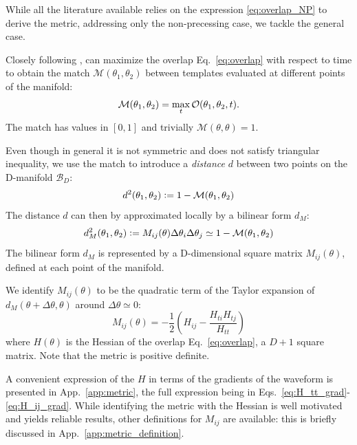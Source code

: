 \documentclass[twocolumn,showpacs,preprintnumbers,nofootinbib,prd,
superscriptaddress,10pt]{revtex4-2}
\begin{document}
While all the literature available \cite{owen_metric, Messenger:2008ta, Prix:2007ks, Brown:2012qf, Roy:2017oul, Coogan:2022qxs, Hanna:2022zpk} relies on the expression \eqref{eq:overlap_NP} to derive the metric, addressing only the non-precessing case, we tackle the general case.

Closely following \cite{owen_metric}, can maximize the overlap Eq.~\eqref{eq:overlap} with respect to time to obtain the match $\mathcal{M}(\theta_1,\theta_2)$ between templates evaluated at different points of the manifold:
\begin{equation}\label{eq:match}
	\mathcal{M}(\theta_1,\theta_2) = \max_t \mathcal{O}(\theta_1,\theta_2, t). \\
\end{equation}
%
The match has values in $[0,1]$ and trivially $\mathcal{M}(\theta,\theta) = 1$.

Even though in general it is not symmetric and does not satisfy triangular inequality, we use the match to introduce a {\it distance} $d$ between two points on the D-manifold $\mathcal{B}_D$:
\begin{align}\label{eq:distance}
	d^2(\theta_1,\theta_2) \vcentcolon= 1 - \mathcal{M}(\theta_1,\theta_2)
\end{align}
The distance $d$ can then by approximated locally by a bilinear form $d_M$:
\begin{align}\label{eq:metric_definition}
	d_M^2(\theta_1,\theta_2) \vcentcolon= M_{ij}(\theta) \Delta\theta_i \Delta\theta_j \simeq 1 - \mathcal{M}(\theta_1,\theta_2)
\end{align}
The bilinear form $d_M$ is represented by a D-dimensional square matrix $M_{ij}(\theta)$, defined at each point of the manifold.

We identify $M_{ij}(\theta)$ to be the quadratic term of the Taylor expansion of ${d_M(\theta+\Delta\theta,\theta)}$ around $\Delta\theta\simeq 0$:
\begin{equation}\label{eq:metric_expression}
	M_{ij}(\theta) = - \frac{1}{2} \left( H_{ij} - \frac{H_{ti}H_{tj}}{H_{tt}} \right)
\end{equation}
where $H(\theta)$ is the Hessian of the overlap Eq.~\eqref{eq:overlap}, a $D+1$ square matrix.
Note that the metric is positive definite.

A convenient expression of the $H$ in terms of the gradients of the waveform is presented in App.~\ref{app:metric}, the full expression being in Eqs.~\eqref{eq:H_tt_grad}-\eqref{eq:H_ij_grad}.
While identifying the metric with the Hessian is well motivated and yields reliable results, other definitions for $M_{ij}$ are available: this is briefly discussed in App.~\ref{app:metric_definition}.
\end{document}
